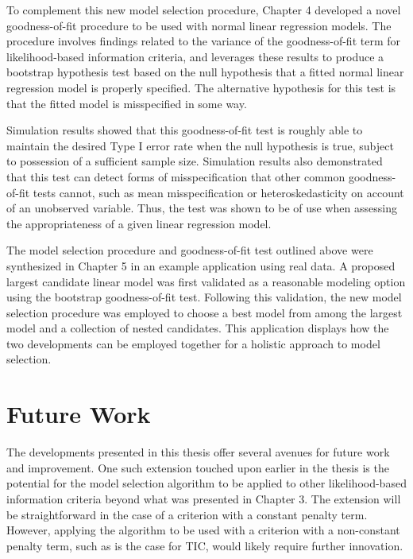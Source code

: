 		To complement this new model selection procedure, Chapter 4 developed a novel goodness-of-fit procedure to be used with normal linear regression models.
		The procedure involves findings related to the variance of the goodness-of-fit term for likelihood-based information criteria, and leverages these
		results to produce a bootstrap hypothesis test based on the null hypothesis that a fitted normal linear regression model is properly specified. The alternative
		hypothesis for this test is that the fitted model is misspecified in some way.

		Simulation results showed that this goodness-of-fit test is roughly able to maintain the desired Type I error rate when the null hypothesis is true, subject
		to possession of a sufficient sample size. Simulation results also demonstrated that this test can detect forms of misspecification that other common
		goodness-of-fit tests cannot, such as mean misspecification or heteroskedasticity on account of an unobserved variable. Thus, the test was shown to be of use
		when assessing the appropriateness of a given linear regression model.

		The model selection procedure and goodness-of-fit test outlined above were synthesized in Chapter 5 in an example application using real data. A proposed
		largest candidate linear model was first validated as a reasonable modeling option using the bootstrap goodness-of-fit test. Following this validation, the new model selection
		procedure was employed to choose a best model from among the largest model and a collection of nested candidates. This application displays how the
		two developments can be employed together for a holistic approach to model selection.

		\section{Future Work}

		The developments presented in this thesis offer several avenues for future work and improvement. One such extension touched upon earlier in the thesis is the
		potential for the model selection algorithm to be applied to other likelihood-based information criteria beyond what was presented in Chapter 3. The extension
		will be straightforward in the case of a criterion with a constant penalty term. However, applying the algorithm to be used with a criterion with a non-constant penalty term,
		such as is the case for TIC, would likely require further innovation.

